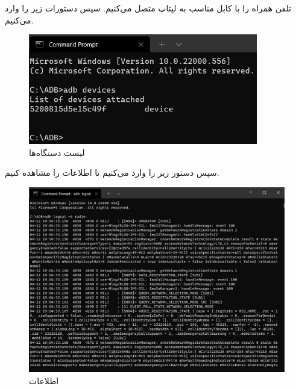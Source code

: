 {تلفن همراه را با کابل مناسب به لپتاپ متصل می‌کنیم. سپس دستورات زیر را وارد می‌کنیم.

\begin{center}
\end{center}
\begin{figure}[H]
    \includegraphics[width=10cm]{Images/devices.jpg}
    \centering
    \caption{لیست دستگاه‌ها}
\end{figure}
\newpage
سپس دستور زیر را وارد می‌کنیم تا اطلاعات
را مشاهده کنیم.
\begin{center}
\end{center}
\begin{figure}[H]
    \includegraphics[width=15cm]{Images/logs.jpg}
    \centering
    \caption{اطلاعات}
\end{figure}
}
